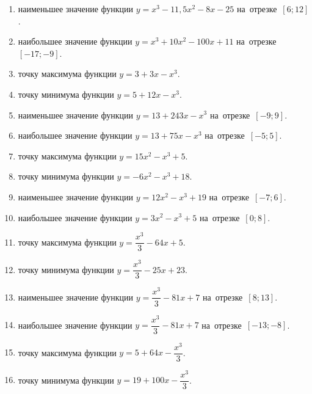 \documentclass[a4paper,10pt]{article}
\begin{document}
\begin{enumerate}
\item {} наименьшее значение функции $y=x^3 -11,5x^2-8x-25$ на~отрезке~$\left[6;12\right]$.

\item {} наибольшее значение функции $y=x^3 +10x^2-100x+11$ на~отрезке~$\left[-17;-9\right]$.

\item {} точку максимума функции $y=3+3x-x^3$.

\item {} точку минимума функции $y=5+12x-x^3$.

\item {} наименьшее значение функции $y=13+243x-x^3$ на~отрезке~$\left[-9;9\right]$.

\item {} наибольшее значение функции $y=13+75x-x^3$ на~отрезке~$\left[-5;5\right]$.

\item {} точку максимума функции $y=15x^2-x^3+5$.

\item {} точку минимума функции $y=-6x^2-x^3+18$.

\item {} наименьшее значение функции $y=12x^2-x^3+19$ на~отрезке~$\left[-7;6\right]$.

\item {} наибольшее значение функции $y=3x^2-x^3+5$ на~отрезке~$\left[0;8\right]$.

\item {} точку максимума функции $y=\dfrac{x^3}{3} -64x+5$.

\item {} точку минимума функции $y=\dfrac{x^3}{3} -25x+23$.

\item {} наименьшее значение функции $y=\dfrac{x^3}{3} -81x+7$ на~отрезке~$\left[8;13\right]$.

\item {} наибольшее значение функции $y=\dfrac{x^3}{3} -81x+7$ на~отрезке~$\left[-13;-8\right]$.

\item {} точку максимума функции $y=5 +64x-\dfrac{x^3}{3}$.

\item {} точку минимума функции $y=19 +100x-\dfrac{x^3}{3}$.


\end{enumerate}
\end{document}

